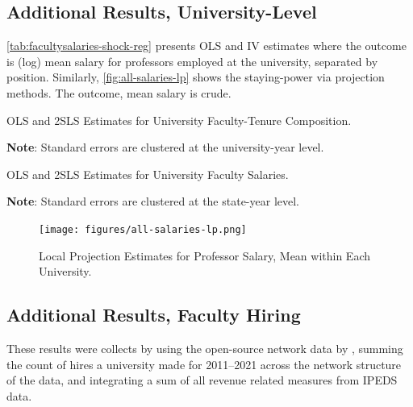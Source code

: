 \subsection{Additional Results, University-Level}

\autoref{tab:facultysalaries-shock-reg} presents OLS and IV estimates where the outcome is (log) mean salary for professors employed at the university, separated by position.
Similarly, \autoref{fig:all-salaries-lp} shows the staying-power via projection methods.
The outcome, mean salary is crude.

\begin{table}[H]
    \singlespacing
    \centering
    \caption{OLS and 2SLS Estimates for University Faculty-Tenure Composition.}
    \makebox[\textwidth][c]{}
    \begin{flushleft}
        \footnotesize
        \textbf{Note}: Standard errors are clustered at the university-year level.
    \end{flushleft}
    \label{tab:tenurecount-shock-reg-fte}
\end{table}

\begin{table}[H]
    \singlespacing
    \centering
    \caption{OLS and 2SLS Estimates for University Faculty Salaries.}
    \makebox[\textwidth][c]{}
    \begin{flushleft}
        \footnotesize
        \textbf{Note}: Standard errors are clustered at the state-year level.
    \end{flushleft}
    \label{tab:facultysalaries-shock-reg}
\end{table}

\begin{figure}[H]
    \centering
    \singlespacing
    \caption{Local Projection Estimates for Professor Salary, Mean within Each University.}
    \texttt{[image: figures/all-salaries-lp.png]}
    \label{fig:all-salaries-lp}
\end{figure}

\subsection{Additional Results, Faculty Hiring}
\label{sec:appendix-hiring}

These results were collects by using the open-source network data by \cite{wapman2022quantifying}, summing the count of hires a university made for 2011--2021 across the network structure of the data, and integrating a sum of all revenue related measures from IPEDS data.

